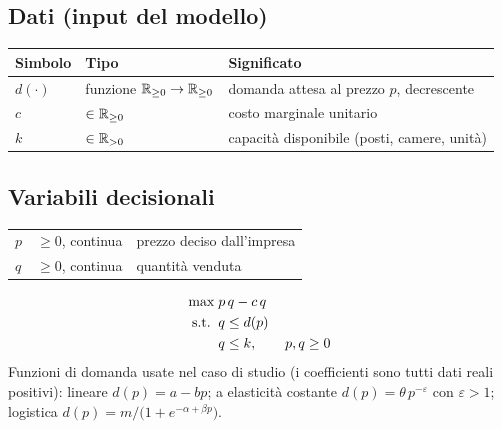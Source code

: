 \subsection*{Dati (input del modello)}
\begin{center}\small
\begin{tabular}{llp{7.4cm}}
\toprule
Simbolo & Tipo & Significato \\
\midrule
$d(\cdot)$ & funzione $\mathbb{R}_{\ge 0} \to \mathbb{R}_{\ge 0}$ & domanda attesa al prezzo $p$, decrescente \\
$c$ & $\in \mathbb{R}_{\ge 0}$ & costo marginale unitario \\
$k$ & $\in \mathbb{R}_{> 0}$ & capacità disponibile (posti, camere, unità) \\
\bottomrule
\end{tabular}
\end{center}

\subsection*{Variabili decisionali}
\begin{center}\small
\begin{tabular}{llp{7.4cm}}
\toprule
$p$ & $\ge 0$, continua & prezzo deciso dall'impresa \\
$q$ & $\ge 0$, continua & quantità venduta \\
\bottomrule
\end{tabular}
\end{center}

\begin{modello}
\begin{align}
\max\;& p\,q - c\,q \notag\\
\text{s.t.}\;\; & q \le d(p) \label{eq:dom7}\\
& q \le k, \qquad p, q \ge 0 \notag
\end{align}
Funzioni di domanda usate nel caso di studio (i coefficienti sono tutti dati reali
positivi): lineare $d(p) = a - bp$; a elasticità costante
$d(p) = \theta\,p^{-\varepsilon}$ con $\varepsilon > 1$; logistica
$d(p) = m / \bigl(1 + e^{-\alpha + \beta p}\bigr)$.
\end{modello}


